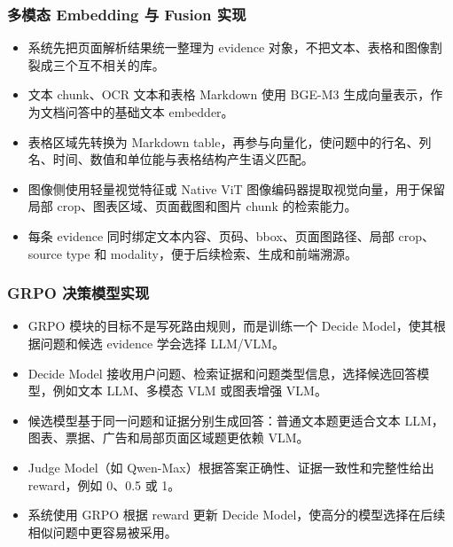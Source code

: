 \documentclass[AutoFakeBold,AutoFakeSlant]{beamer}
\begin{document}
\begin{frame}
  \frametitle{多模态 Embedding 与 Fusion 实现}
  \begin{itemize}
    \item 系统先把页面解析结果统一整理为 evidence 对象，不把文本、表格和图像割裂成三个互不相关的库。
    \item 文本 chunk、OCR 文本和表格 Markdown 使用 BGE-M3 生成向量表示，作为文档问答中的基础文本 embedder。
    \item 表格区域先转换为 Markdown table，再参与向量化，使问题中的行名、列名、时间、数值和单位能与表格结构产生语义匹配。
    \item 图像侧使用轻量视觉特征或 Native ViT 图像编码器提取视觉向量，用于保留局部 crop、图表区域、页面截图和图片 chunk 的检索能力。
    \item 每条 evidence 同时绑定文本内容、页码、bbox、页面图路径、局部 crop、source type 和 modality，便于后续检索、生成和前端溯源。
  \end{itemize}
\end{frame}

\begin{frame}
  \frametitle{GRPO 决策模型实现}
  \begin{itemize}
    \item GRPO 模块的目标不是写死路由规则，而是训练一个 Decide Model，使其根据问题和候选 evidence 学会选择 LLM/VLM。
    \item Decide Model 接收用户问题、检索证据和问题类型信息，选择候选回答模型，例如文本 LLM、多模态 VLM 或图表增强 VLM。
    \item 候选模型基于同一问题和证据分别生成回答：普通文本题更适合文本 LLM，图表、票据、广告和局部页面区域题更依赖 VLM。
    \item Judge Model（如 Qwen-Max）根据答案正确性、证据一致性和完整性给出 reward，例如 0、0.5 或 1。
    \item 系统使用 GRPO 根据 reward 更新 Decide Model，使高分的模型选择在后续相似问题中更容易被采用。
  \end{itemize}
\end{frame}
\end{document}
